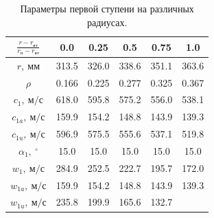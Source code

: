 \documentclass[a4paper,12pt]{article}
\begin{document}
    \begin{longtable}{
    |
%    
    c|
%    
    c|
%    
    c|
%    
    c|
%    
    c|
%    
    c|
%    
    }
        \caption{Параметры первой ступени на различных радиусах.}\\
        \hline

%        
        $\frac{r - r_{вт}}{r_{п} - r_{вт}}$
%        
        & 0.0
%        
        & 0.25
%        
        & 0.5
%        
        & 0.75
%        
        & 1.0
%        
        \\
        \hline
%        
        $r,\ мм$
%        
        & 313.5
%        
        & 326.0
%        
        & 338.6
%        
        & 351.1
%        
        & 363.6
%        
        \\
        \hline
%        
        $\rho$
%        
        & 0.166
%        
        & 0.225
%        
        & 0.277
%        
        & 0.325
%        
        & 0.367
%        
        \\
        \hline
%        
        $c_1,\ м/с$
%        
        & 618.0
%        
        & 595.8
%        
        & 575.2
%        
        & 556.0
%        
        & 538.1
%        
        \\
        \hline
%        
        $c_{1a},\ м/с$
%        
        & 159.9
%        
        & 154.2
%        
        & 148.8
%        
        & 143.9
%        
        & 139.3
%        
        \\
        \hline
%        
        $c_{1u},\ м/с$
%        
        & 596.9
%        
        & 575.5
%        
        & 555.6
%        
        & 537.1
%        
        & 519.8
%        
        \\
        \hline
%        
        $\alpha_1,\ ^\circ$
%        
        & 15.0
%        
        & 15.0
%        
        & 15.0
%        
        & 15.0
%        
        & 15.0
%        
        \\
        \hline
%        
        $w_1,\ м/с$
%        
        & 284.9
%        
        & 252.5
%        
        & 222.7
%        
        & 195.7
%        
        & 172.0
%        
        \\
        \hline
%        
        $w_{1a},\ м/с$
%        
        & 159.9
%        
        & 154.2
%        
        & 148.8
%        
        & 143.9
%        
        & 139.3
%        
        \\
        \hline
%        
        $w_{1u},\ м/с$
%        
        & 235.8
%        
        & 199.9
%        
        & 165.6
%        
        & 132.7

\end{longtable}
\end{document}
